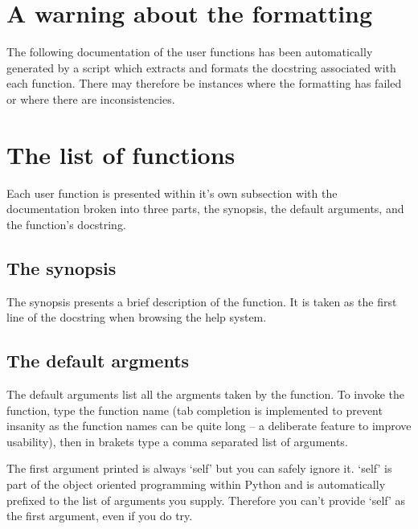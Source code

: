 \documentclass[a4paper, 11pt, twoside, openright]{book}
\begin{document}

\section{A warning about the formatting}

The following documentation of the user functions has been automatically generated by a script which extracts and formats the docstring associated with each function.  There may therefore be instances where the formatting has failed or where there are inconsistencies.



\section{The list of functions}

Each user function is presented within it's own subsection with the documentation broken into three parts, the synopsis, the default arguments, and the function's docstring.


\subsection{The synopsis}

The synopsis presents a brief description of the function.  It is taken as the first line of the docstring when browsing the help system.


\subsection{The default argments}

The default arguments list all the argments taken by the function.  To invoke the function, type the function name (tab completion is implemented to prevent insanity as the function names can be quite long -- a deliberate feature to improve usability), then in brakets type a comma separated list of arguments.

The first argument printed is always `self' but you can safely ignore it.  `self' is part of the object oriented programming within Python and is automatically prefixed to the list of arguments you supply.  Therefore you can't provide `self' as the first argument, even if you do try.
\end{document}
